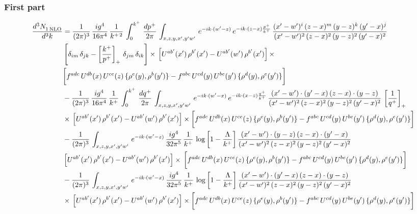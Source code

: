 \documentclass[9pt]{article}
\numberwithin{equation}{section}
\begin{document}
\subsubsection*{First part}
\begin{align}
     \frac{d^{3}N_{1\,\rm NLO}^{\rm}}{d^{3}k}  & = \frac{1}{(2\pi)^{3}}\, \frac{ig^{4}}{16\pi^{4}}\, \frac{1}{k^{+\,2}}\,\int_{0}^{k^{+}}\, \frac{dp^{+}}{2\pi}\,\int_{x,z,y,x',y'w'}\,e^{-ik\cdot (w^\prime-z)}\,e^{-ik\cdot (z-x)\frac{p^{+}}{k^{+}}}\,\frac{(x'-w')^{i}\,(z-x)^{m}\,(y-z)^{k}\,(y'-x)^{j}}{(x'-w')^{2}\,(z-x)^{2}\,(y-z)^{2}\,(y'-x)^{2}}\,\notag \\ & \left[\delta_{im}\,\delta_{jk}-\left[\frac{k^{+}}{p^{+}}\right]_{+}\, \delta_{jm}\,\delta_{ik}\right]\times\, \left[U^{ab'}(x')\,\rho^{b'}(x')-U^{ab'}(w')\,\rho^{b'}(x')\right]\times\notag \\ & \bigg[f^{adc}\,U^{db}(x)\,U^{ce}(z)\, \{\rho^{e}(y),\rho^{b}(y')\}-f^{abc}\,U^{cd}(y)\,U^{be}(y')\, \{\rho^{d}(y),\rho^{e}(y')\}\bigg]\notag \\ & -\frac{1}{(2\pi)^{3}}\, \frac{ig^{4}}{16\pi^{4}}\, \frac{1}{k^{+}}\,\int_{0}^{k^{+}}\, \frac{dq^{+}}{2\pi}\,\int_{x,z,y,x',y'w'}\,e^{-ik\cdot (w^\prime-x)}\,e^{-ik\cdot (x-z)\frac{q^{+}}{k^{+}}}\,\frac{(x'-w')\cdot (y'-x)\,(z-x)\cdot (y-z)}{(x'-w')^{2}\,(z-x)^{2}\,(y-z)^{2}\,(y'-x)^{2}}\,\left[\frac{1}{q^{+}}\right]_{+}\notag \\ & \times\, \left[U^{ab'}(x')\,\rho^{b'}(x')-U^{ab'}(w')\,\rho^{b'}(x')\right]\times \bigg[f^{adc}\,U^{db}(x)\,U^{ce}(z)\, \{\rho^{e}(y),\rho^{b}(y')\}-f^{abc}\,U^{cd}(y)\,U^{be}(y')\, \{\rho^{d}(y),\rho^{e}(y')\}\bigg]\notag \\ & -\frac{1}{(2\pi)^{3}}\, \int_{x,z,y,x',y'w'}\,e^{-ik\cdot (w^\prime-z)}\,\frac{ig^{4}}{32\pi^{5}}\, \frac{1}{k^{+}}\,\log{\left[1-\frac{\Lambda}{k^{+}}\right]}\,\frac{(x'-w')\cdot (y-z)\,(z-x)\cdot (y'-x)}{(x'-w')^{2}\,(z-x)^{2}\,(y-z)^{2}\,(y'-x)^{2}}\,\notag \\ & \left[U^{ab'}(x')\,\rho^{b'}(x')-U^{ab'}(w')\,\rho^{b'}(x')\right]\times\, \bigg[f^{adc}\,U^{db}(x)\,U^{ce}(z)\, \{\rho^{e}(y),\rho^{b}(y')\}-f^{abc}\,U^{cd}(y)\,U^{be}(y')\, \{\rho^{d}(y),\rho^{e}(y')\}\bigg]\notag \\ &  -\frac{1}{(2\pi)^{3}}\, \int_{x,z,y,x',y'w'}\,e^{-ik\cdot (w^\prime-x)}\,\frac{ig^{4}}{32\pi^{5}}\, \frac{1}{k^{+}}\, \log{\left[1-\frac{\Lambda}{k^{+}}\right]}\,\frac{(x'-w')\cdot (y'-x)\,(z-x)\cdot (y-z)}{(x'-w')^{2}\,(z-x)^{2}\,(y-z)^{2}\,(y'-x)^{2}}\notag \\ & \times\, \left[U^{ab'}(x')\,\rho^{b'}(x')-U^{ab'}(w')\,\rho^{b'}(x')\right]\times \bigg[f^{adc}\,U^{db}(x)\,U^{ce}(z)\, \{\rho^{e}(y),\rho^{b}(y')\}-f^{abc}\,U^{cd}(y)\,U^{be}(y')\, \{\rho^{d}(y),\rho^{e}(y')\}\bigg]
\end{align}
\end{document}
